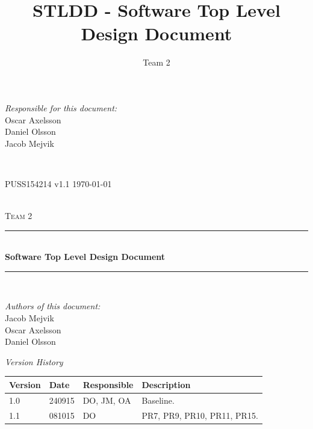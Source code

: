\documentclass[a4paper]{article}
\title{STLDD - Software Top Level Design Document}
\author{Team 2}
\begin{document}
	\begin{titlepage}
		\newcommand{\HRule}{\rule{\linewidth}{0.5mm}}
		
		\begin{minipage}{0.5\textwidth}
			\begin{flushleft} %
				\textit{Responsible for this document:}\\
				Oscar Axelsson \\
				Daniel Olsson \\
				Jacob Mejvik
			\end{flushleft}
		\end{minipage}
		~
		\begin{minipage}{0.4\textwidth}
			\begin{flushright}
				PUSS154214 v1.1
				\today
			\end{flushright}
		\end{minipage}\\[3cm]
		
		\centering
		\textsc{\LARGE Team 2}\\[0.5cm]
		
		\HRule \\[0.4cm]
		{ \huge \bfseries Software Top Level Design Document}\\[0.4cm] %
		\HRule \\[1.5cm]
		
		\vfill
		\begin{flushleft}
			\textit{Authors of this document:}\\
			Jacob Mejvik \\
			Oscar Axelsson \\
			Daniel Olsson
		\end{flushleft}
		
	\end{titlepage}
	\setcounter{tocdepth}{2}
	
	\begin{center}
		\textit{\large Version History}
		
		\begin{tabular}{ | l | l | l | p{5cm} |}
			\hline
			\textbf{Version} 	& \textbf{Date} 	& \textbf{Responsible} 	& \textbf{Description} 		\\ \hline
			1.0				 	& 240915 			& DO, JM, OA			&  Baseline. 				\\ \hline
			1.1 			 	& 081015 			& DO					&  PR7, PR9, PR10, PR11, PR15. \\ \hline			
		\end{tabular}
	\end{center}
	
\end{document}
